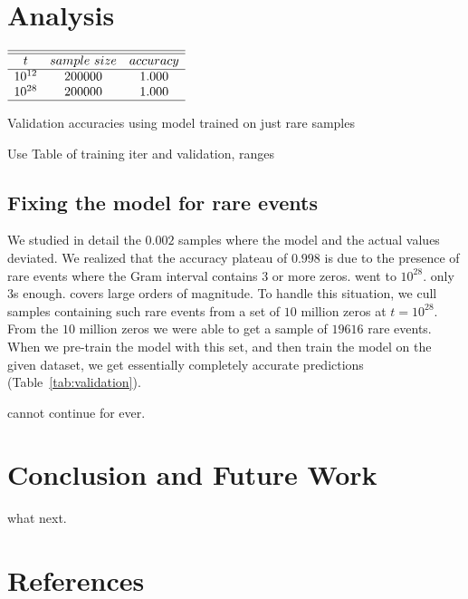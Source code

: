 \documentclass[journal]{IEEEtai}
\begin{document}
\section{Analysis}

\begin{table}
\centering \(\begin{array}{ccc}
\hline
\hline
t     &sample~size&accuracy\\
\hline
10^{12}  & 200000 & 1.000 \\

10^{28}  & 200000 & 1.000 \\
\hline
\end{array}\)
\caption{Validation accuracies using model trained on just  rare samples}
\label{tab:validation}
\end{table}

Use 
Table of training iter and validation, ranges

\subsection{\label{rarefix}Fixing the model for rare events}
We studied in detail the $0.002$ samples where the model and the actual values deviated. 
We realized that the accuracy plateau of $0.998$ is due to the presence of rare events where the Gram interval contains $3$ or more zeros. went to $10^{28}$. only 3s enough. covers large orders of magnitude. To handle this situation, we cull samples containing such rare events from a set of $10$ million zeros at $t=10^{28}$. From the $10$ million zeros we were able to get a sample of $19616$ rare events. When we pre-train the model with this set, and then train the model on the given dataset, we get essentially completely accurate predictions (Table~\ref{tab:validation}).

cannot continue for ever.


\section{Conclusion and Future Work}

what next.





\section*{References}
\end{document}
